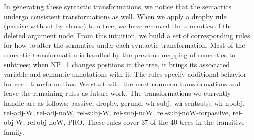 \documentclass[11pt,a4paper]{article}
\begin{document}
In generating these syntactic transformations, we notice that the semantics undergo consistent transformations as well. When we apply a dropby rule (passive without by clause) to a tree, we have removed the semantics of the deleted argument node. From this intuition, we build a set of corresponding rules for how to alter the semantics under each syntactic transformation. Most of the semantic transformation is handled by the previous mapping of semantics to subtrees; when NP\_1 changes positions in the tree, it brings its associated variable and semantic annotations with it. The rules specify additional behavior for each transformation. We start with the most common transformations and leave the remaining rules as future work. The transformations we currently handle are as follows: passive, dropby, gerund, wh-subj, wh-sentsubj, wh-npobj, rel-adj-W, rel-adj-noW, rel-subj-W, rel-subj-noW, rel-subj-noW-forpassive, rel-obj-W, rel-obj-noW, PRO. These rules cover 37 of the 40 trees in the transitive family.
\end{document}
